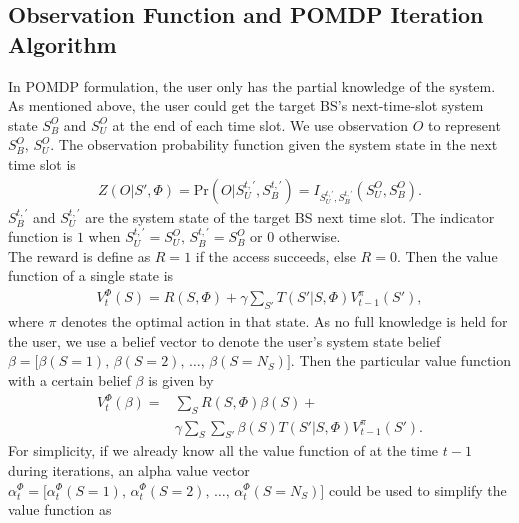 \documentclass[conference]{IEEEtran}
\begin{document}
\subsection{Observation Function and POMDP Iteration Algorithm}
In POMDP formulation, the user only has the partial knowledge of the system.
As mentioned above, the user could get the target BS's next-time-slot system state
\(S_B^O\) and \(S_U^O\) at the end of each time slot.
We use observation \(O\) to represent \(S_B^O,\,S_U^O\).
The observation probability function given the system state in the next time slot is
\begin{align}
	Z\left(O|S',\Phi\right) = \mbox{Pr}\left(O\Big|S_U^{t,'}, S_B^{t,'}\right) =
	I_{S_U^{t,'},S_B^{t,'}}\left(S_U^O, S_B^O\right).
\end{align}
\(S_B^{t,'}\) and \(S_U^{t,'}\) are the system state of the target BS next time slot.
The indicator function is \(1\) when \(S_U^{t,'} = S_U^O,\,S_B^{t,'}=S_B^O\) or \(0\) otherwise.\\\indent
The reward is define as \(R = 1\) if the access succeeds, else \(R= 0\).
Then the value function of a single state is
\begin{equation}
\begin{aligned}
	V_t^\Phi\left(S\right) = R\left(S,\Phi\right) +\gamma\sum\limits_{S'}T\left(S'|S,\Phi\right)V_{t-1}^\pi\left(S'\right),
\end{aligned}
\end{equation}
where \(\pi\) denotes the optimal action in that state.
As no full knowledge is held for the user, we use a belief vector to denote the user's system state belief
\(\beta = \lbrack \beta\left(S = 1\right),\,\beta\left(S = 2\right),\,\ldots,\,\beta\left(S = N_S\right)\rbrack\).	
Then the particular value function with a certain belief \(\beta\) is given by
\begin{equation}
\begin{aligned}
	V_t^\Phi\left(\beta\right) = & \sum\limits_{S}R\left(S,\Phi\right)\beta\left(S\right) +\\
	&	\gamma\sum\limits_{S}\sum\limits_{S'}\beta\left(S\right)T\left(S'|S,\Phi\right)V_{t-1}^\pi\left(S'\right).
\end{aligned}
\end{equation}
For simplicity, if we already know all the value function of at the time \(t-1\) during iterations,
an alpha value vector \(\alpha_t^\Phi = \lbrack \alpha_t^\Phi\left(S = 1\right),\,
\alpha_t^\Phi\left(S = 2\right),\,\ldots,\,\alpha_t^\Phi\left(S = N_S\right)\rbrack\)
could be used to simplify the value function as
\end{document}
